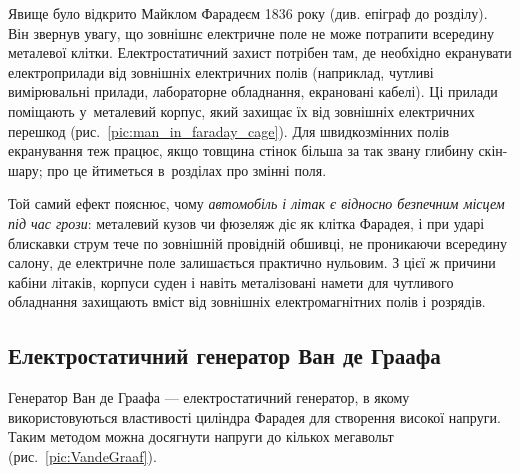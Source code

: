 Явище було відкрито Майклом Фарадеєм 1836 року (див. епіграф до розділу). Він звернув увагу, що зовнішнє
електричне поле не може потрапити всередину металевої клітки. Електростатичний
захист потрібен там, де необхідно екранувати електроприлади від зовнішніх
електричних полів (наприклад, чутливі вимірювальні прилади, лабораторне обладнання,
екрановані кабелі). Ці прилади поміщають у~металевий корпус, який захищає
їх від зовнішніх електричних перешкод (рис.~\ref{pic:man_in_faraday_cage}). Для швидкозмінних
полів екранування теж працює, якщо товщина стінок більша за так звану глибину скін-шару;
про це йтиметься в~розділах про змінні поля.

Той самий ефект пояснює, чому \emph{автомобіль і літак є відносно безпечним місцем під час грози}: металевий кузов чи фюзеляж діє як клітка Фарадея, і при ударі блискавки струм тече по зовнішній провідній обшивці, не проникаючи всередину салону, де електричне поле залишається практично нульовим. З цієї ж причини кабіни літаків, корпуси суден і навіть металізовані намети для чутливого обладнання захищають вміст від зовнішніх електромагнітних полів і розрядів.





\subsection*{Електростатичний генератор Ван де Граафа}



Генератор Ван де Граафа --- електростатичний генератор, в якому використовуються властивості
циліндра Фарадея для створення високої напруги. Таким методом можна досягнути напруги до
кількох мегавольт (рис.~\ref{pic:VandeGraaf}).

